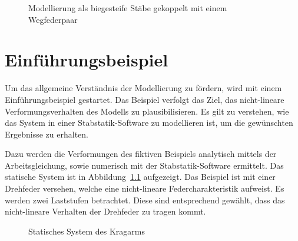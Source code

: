 \documentclass[
  11pt,
  letterpaper,
]{scrreprt}
\begin{document}
\begin{figure}[H]


\caption{\label{fig-modell_wegfeder}Modellierung als biegesteife Stäbe
gekoppelt mit einem Wegfederpaar}

\end{figure}%


\chapter{Einführungsbeispiel}\label{einfuxfchrungsbeispiel}

Um das allgemeine Verständnis der Modellierung zu fördern, wird mit
einem Einführungsbeispiel gestartet. Das Beispiel verfolgt das Ziel, das
nicht-lineare Verformungsverhalten des Modells zu plausibilisieren. Es
gilt zu verstehen, wie das System in einer Stabstatik-Software zu
modellieren ist, um die gewünschten Ergebnisse zu erhalten.

Dazu werden die Verformungen des fiktiven Beispiels analytisch mittels
der Arbeitsgleichung, sowie numerisch mit der Stabstatik-Software
ermittelt. Das statische System ist in Abbildung~\ref{fig-kragarm-feder}
aufgezeigt. Das Beispiel ist mit einer Drehfeder versehen, welche eine
nicht-lineare Federcharakteristik aufweist. Es werden zwei Laststufen
betrachtet. Diese sind entsprechend gewählt, dass das nicht-lineare
Verhalten der Drehfeder zu tragen kommt.

\begin{figure}[H]


\caption{\label{fig-kragarm-feder}Statisches System des Kragarms}

\end{figure}%
\end{document}
